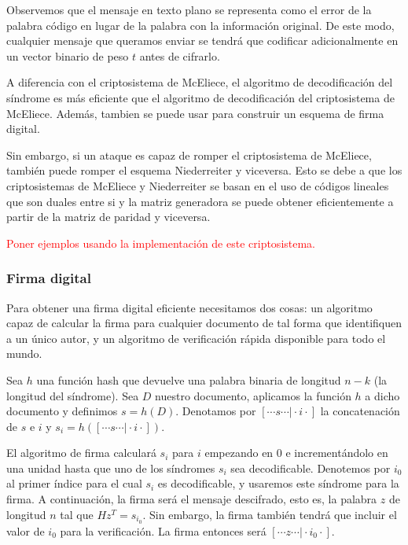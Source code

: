 Observemos que el mensaje en texto plano se representa como el error de la palabra código en lugar de la palabra con la información original. De este modo, cualquier mensaje que queramos enviar se tendrá que codificar adicionalmente en un vector binario de peso $t$ antes de cifrarlo.

A diferencia con el criptosistema de McEliece, el algoritmo de decodificación del síndrome es más eficiente que el algoritmo de decodificación del criptosistema de McEliece. Además, tambien se puede usar para construir un esquema de firma digital.

Sin embargo, si un ataque es capaz de romper el criptosistema de McEliece, también puede romper el esquema Niederreiter y viceversa. Esto se debe a que los criptosistemas de McEliece y Niederreiter se basan en el uso de códigos lineales que son duales entre si y la matriz generadora se puede obtener eficientemente a partir de la matriz de paridad y viceversa.

\textcolor{red}{Poner ejemplos usando la implementación de este criptosistema.}


\subsubsection{Firma digital}

Para obtener una firma digital eficiente necesitamos dos cosas: un algoritmo capaz de calcular la firma para cualquier documento de tal forma que identifiquen a un único autor, y un algoritmo de verificación rápida disponible para todo el mundo.

Sea $h$ una función hash que devuelve una palabra binaria de longitud $n - k$ (la longitud del síndrome). Sea $D$ nuestro documento, aplicamos la función $h$ a dicho documento y definimos $s = h(D)$. Denotamos por $[ \cdots s \cdots \vert \cdot i \cdot]$ la concatenación de $s$ e $i$ y $s_i = h([ \cdots s \cdots \vert \cdot i \cdot])$.

El algoritmo de firma calculará $s_i$ para $i$ empezando en $0$ e incrementándolo en una unidad hasta que uno de los síndromes $s_i$ sea decodificable. Denotemos por $i_0$ al primer índice para el cual $s_i$ es decodificable, y usaremos este síndrome para la firma. A continuación, la firma será el mensaje descifrado, esto es, la palabra $z$ de longitud $n$ tal que $Hz^T = s_{i_0}$. Sin embargo, la firma también tendrá que incluir el valor de $i_0$ para la verificación. La firma entonces será $[\cdots z \cdots \vert \cdot i_0 \cdot]$.

